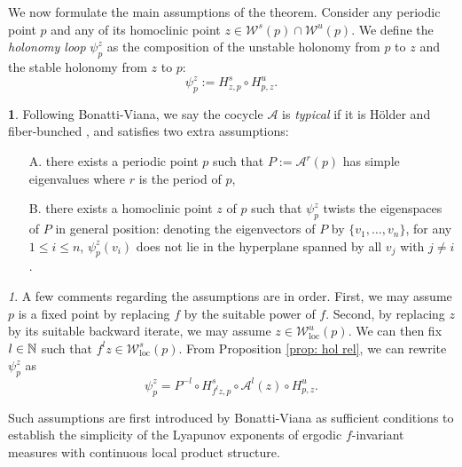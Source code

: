 \documentclass[11pt,oneside,reqno]{amsart}
\numberwithin{equation}{section}
\numberwithin{figure}{section}
\theoremstyle{definition}
\theoremstyle{definition}
\theoremstyle{definition}
\newtheorem{defn}[thm]{\protect\definitionname}
\theoremstyle{definition}
\theoremstyle{remark}
\newtheorem{rem}[thm]{\protect\remarkname}
\theoremstyle{definition}
\theoremstyle{definition}
\theoremstyle{definition}
\def\A{\mathcal{A}}
\def\W{\mathcal{W}}
\def\hol{H\"older }
\def\fb{fiber-bunched }
\newcommand{\Wloc}{\mathcal{W}_{\text{loc}}}
\providecommand{\definitionname}{Definition}
\providecommand{\remarkname}{Remark}
\begin{document}
We now formulate the main assumptions of the theorem. Consider any periodic point $p$ and any of its homoclinic point $z \in \W^s(p )\cap \W^u(p)$. We define the \textit{holonomy loop} $\psi_p^z$ as the composition of the unstable holonomy from $p$ to $z$ and the stable holonomy from $z$ to $p$:
$$\psi_p^z  := H^s_{z,p}\circ H^u_{p,z}.$$
\begin{defn}
Following Bonatti-Viana, we say the cocycle $\A$ is \textit{typical} if it is \hol and \fb, and satisfies two extra assumptions:
\begin{enumerate}
\item[A.] there exists a periodic point $p$ such that $P:=\A^r(p)$ has simple eigenvalues where $r$ is the period of $p$,  
\item[B.] there exists a homoclinic point $z$ of $p$ such that $\psi_p^z$ twists the eigenspaces of $P$ in general position: denoting the eigenvectors of $P$ by $\{v_1,\ldots,v_n\}$, for any $1 \leq i \leq n$, $\psi_p^z(v_i)$ does not lie in the hyperplane spanned by all $v_j$ with $j \neq i$.
\end{enumerate}
\end{defn}
\begin{rem}
A few comments regarding the assumptions are in order. First, we may assume $p$ is a fixed point by replacing $f$ by the suitable power of $f$. Second, by replacing $z$ by its suitable backward iterate, we may assume $z \in \Wloc^u(p)$. We can then fix $l \in \mathbb{N}$ such that $f^lz \in \Wloc^s(p)$. From Proposition \ref{prop:  hol rel}, we can rewrite $\psi_p^z$ as
\begin{equation}\label{eq: psi_p^z}
\psi_p^z=P^{-l} \circ H^s_{f^lz,p}\circ\A^l(z) \circ H^u_{p,z}.
\end{equation}


\end{rem}

Such assumptions are first introduced by Bonatti-Viana as sufficient conditions to establish the simplicity of the Lyapunov exponents of ergodic $f$-invariant measures with continuous local product structure.
\end{document}
